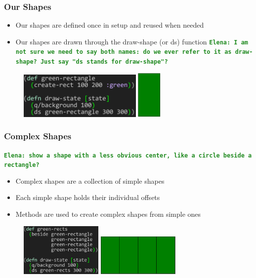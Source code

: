 \documentclass{beamer}
\newcommand{\comment}[1]{{\bf \tt  {#1}}}
\newcommand{\emcomment}[1]{\textcolor{ForestGreen}{\comment{Elena: {#1}}}}
\begin{document}
\begin{frame}
\frametitle{Our Shapes}
	\begin{itemize}
		\item Our shapes are defined once in setup and reused when needed
		\item Our shapes are drawn through the draw-shape (or ds) function \emcomment{I am not sure we need to say both names: do we ever refer to it as draw-shape? Just say "ds stands for draw-shape"?}
	\end{itemize}
	\begin{figure}
		\includegraphics[width=6cm]{PresentationImages/fcsGreenRect.png}
		\hspace{1cm}
		\includegraphics[width=1.2cm]{PresentationImages/greenRectangle.png}
	\end{figure}
\end{frame}

\begin{frame}
\frametitle{Complex Shapes}
\emcomment{show a shape with a less obvious center, like a circle beside a rectangle?} 
	\begin{itemize}
		\item Complex shapes are a collection of simple shapes
		\item Each simple shape holds their individual offsets
		\item Methods are used to create complex shapes from simple ones
	\end{itemize}
	\begin{figure}
	\includegraphics[width=4cm]{PresentationImages/fcsGreenRects.png}
	\hspace{1cm}
	\includegraphics[width=4cm]{PresentationImages/4GreenRects.png}
	\end{figure}
\end{frame}
\end{document}
